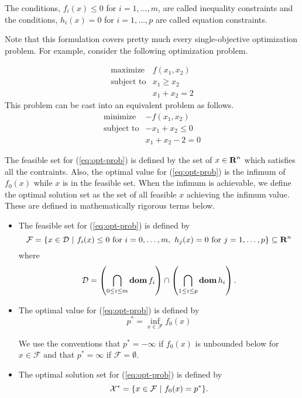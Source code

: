 \documentclass[10pt, twoside]{book}   	%
\newcommand{\feasibleset}{\mathcal{F}}
\newcommand{\optsolset}{\mathcal{X}^\ast}
\begin{document}
The conditions, $f_i(x) \leq 0$ for $ i = 1, \ldots, m$, are called inequality constraints
and the conditions, $ h_i(x) = 0 $ for $ i = 1, \ldots, p$ are called equation constraints.

Note that this formulation covers pretty much every single-objective optimization problem.
For example,
consider the following optimization problem.

\begin{equation}
\begin{array}{ll}
\mbox{maximize} & f(x_1,x_2)
\\
\mbox{subject to} & x_1 \geq x_2
\\
& x_1 + x_2 = 2
\end{array}
\end{equation}
This problem can be cast into an equivalent problem as follows.
\begin{equation}
\begin{array}{ll}
\mbox{minimize} & -f(x_1,x_2)
\\
\mbox{subject to} & - x_1 + x_2 \leq 0
\\
& x_1 + x_2 - 2 = 0
\end{array}
\end{equation}


The feasible set for (\ref{eq:opt-prob}) is defined by the set of $x\in{\mbox{\bf R}}^n$ which satisfies all the contraints.
Also, the optimal value for (\ref{eq:opt-prob}) is the infimum of $f_0(x)$ while $x$ is in the feasible set.
When the infimum is achievable, we define the optimal solution set as the set of all feasible $x$ achieving
the infimum value.
These are defined in mathematically rigorous terms below.

\begin{itemize}

\item
The feasible set for (\ref{eq:opt-prob}) is defined by
\begin{equation}
\feasibleset
=
\set{x\in \mathcal{D}}
{ f_i(x)\leq 0 \mbox{ for } i =0, \ldots, m,\ h_j(x) = 0 \mbox{ for } j = 1,\ldots,p}
\subseteq \reals^n
\end{equation}
where
\begin{equation}
\mathcal{D} = \left( \bigcap_{0\leq i\leq m} \mathop{\bf dom} f_i \right) \cap \left( \bigcap_{1\leq i\leq p} \mathop{\bf dom} h_i \right).
\end{equation}

\item
The optimal value for (\ref{eq:opt-prob}) is defined by
\begin{equation}
p^\ast = \inf_{x\in\feasibleset} f_0(x)
\end{equation}

We use the conventions that $p^\ast = -\infty$ if $f_0(x)$ is unbounded below for $x\in \feasibleset$
and that $p^\ast = \infty$ if $\feasibleset = \emptyset$.

\item
The optimal solution set for (\ref{eq:opt-prob}) is defined by
\begin{equation}
\optsolset = \set{x\in\feasibleset}{f_0(x) = p^\ast}.
\end{equation}


\end{itemize}
\end{document}
